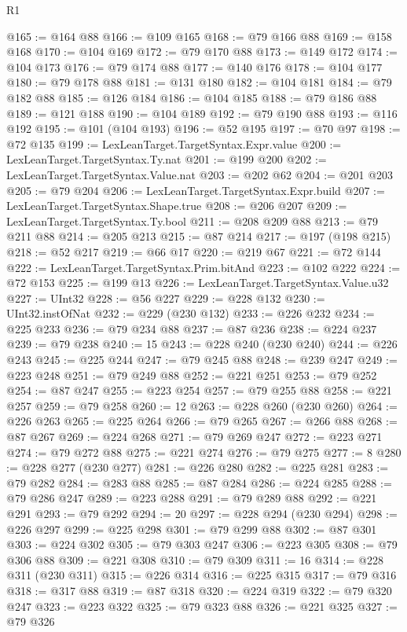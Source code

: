 \begin{lexlean}{R1}
\begin{coremodule}
@165 := @164 @88
@166 := @109 @165
@168 := @79 @166 @88
@169 := @158 @168
@170 := @104 @169
@172 := @79 @170 @88
@173 := @149 @172
@174 := @104 @173
@176 := @79 @174 @88
@177 := @140 @176
@178 := @104 @177
@180 := @79 @178 @88
@181 := @131 @180
@182 := @104 @181
@184 := @79 @182 @88
@185 := @126 @184
@186 := @104 @185
@188 := @79 @186 @88
@189 := @121 @188
@190 := @104 @189
@192 := @79 @190 @88
@193 := @116 @192
@195 := @101 (@104 @193)
@196 := @52 @195
@197 := @70 @97
@198 := @72 @135
@199 := LexLeanTarget.TargetSyntax.Expr.value
@200 := LexLeanTarget.TargetSyntax.Ty.nat
@201 := @199 @200
@202 := LexLeanTarget.TargetSyntax.Value.nat
@203 := @202 @62
@204 := @201 @203
@205 := @79 @204
@206 := LexLeanTarget.TargetSyntax.Expr.build
@207 := LexLeanTarget.TargetSyntax.Shape.true
@208 := @206 @207
@209 := LexLeanTarget.TargetSyntax.Ty.bool
@211 := @208 @209 @88
@213 := @79 @211 @88
@214 := @205 @213
@215 := @87 @214
@217 := @197 (@198 @215)
@218 := @52 @217
@219 := @66 @17
@220 := @219 @67
@221 := @72 @144
@222 := LexLeanTarget.TargetSyntax.Prim.bitAnd
@223 := @102 @222
@224 := @72 @153
@225 := @199 @13
@226 := LexLeanTarget.TargetSyntax.Value.u32
@227 := UInt32
@228 := @56 @227
@229 := @228 @132
@230 := UInt32.instOfNat
@232 := @229 (@230 @132)
@233 := @226 @232
@234 := @225 @233
@236 := @79 @234 @88
@237 := @87 @236
@238 := @224 @237
@239 := @79 @238
@240 := 15
@243 := @228 @240 (@230 @240)
@244 := @226 @243
@245 := @225 @244
@247 := @79 @245 @88
@248 := @239 @247
@249 := @223 @248
@251 := @79 @249 @88
@252 := @221 @251
@253 := @79 @252
@254 := @87 @247
@255 := @223 @254
@257 := @79 @255 @88
@258 := @221 @257
@259 := @79 @258
@260 := 12
@263 := @228 @260 (@230 @260)
@264 := @226 @263
@265 := @225 @264
@266 := @79 @265
@267 := @266 @88
@268 := @87 @267
@269 := @224 @268
@271 := @79 @269 @247
@272 := @223 @271
@274 := @79 @272 @88
@275 := @221 @274
@276 := @79 @275
@277 := 8
@280 := @228 @277 (@230 @277)
@281 := @226 @280
@282 := @225 @281
@283 := @79 @282
@284 := @283 @88
@285 := @87 @284
@286 := @224 @285
@288 := @79 @286 @247
@289 := @223 @288
@291 := @79 @289 @88
@292 := @221 @291
@293 := @79 @292
@294 := 20
@297 := @228 @294 (@230 @294)
@298 := @226 @297
@299 := @225 @298
@301 := @79 @299 @88
@302 := @87 @301
@303 := @224 @302
@305 := @79 @303 @247
@306 := @223 @305
@308 := @79 @306 @88
@309 := @221 @308
@310 := @79 @309
@311 := 16
@314 := @228 @311 (@230 @311)
@315 := @226 @314
@316 := @225 @315
@317 := @79 @316
@318 := @317 @88
@319 := @87 @318
@320 := @224 @319
@322 := @79 @320 @247
@323 := @223 @322
@325 := @79 @323 @88
@326 := @221 @325
@327 := @79 @326

\end{coremodule}
\end{lexlean}
